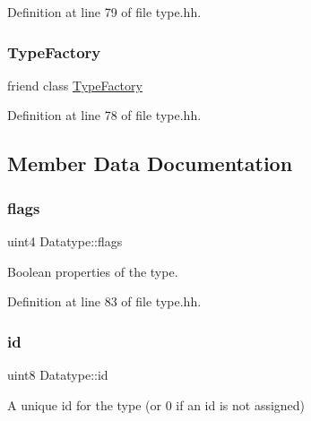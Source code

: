 Definition at line 79 of file type.\+hh.

\mbox{\label{class_datatype_ac8c1945d0a63785e78b3e09a13226ed6}} 
\subsubsection{\texorpdfstring{TypeFactory}{TypeFactory}}
{\footnotesize\ttfamily friend class \mbox{\hyperlink{class_type_factory}{Type\+Factory}}\hspace{0.3cm}{\ttfamily [friend]}}



Definition at line 78 of file type.\+hh.



\subsection{Member Data Documentation}
\mbox{\label{class_datatype_a82e59a9379488b5afdae69817c0955fb}} 
\subsubsection{\texorpdfstring{flags}{flags}}
{\footnotesize\ttfamily uint4 Datatype\+::flags\hspace{0.3cm}{\ttfamily [protected]}}



Boolean properties of the type. 



Definition at line 83 of file type.\+hh.

\mbox{\label{class_datatype_ac2bb702c6067fae98d7c0257e928d5a1}} 
\subsubsection{\texorpdfstring{id}{id}}
{\footnotesize\ttfamily uint8 Datatype\+::id\hspace{0.3cm}{\ttfamily [protected]}}



A unique id for the type (or 0 if an id is not assigned) 



